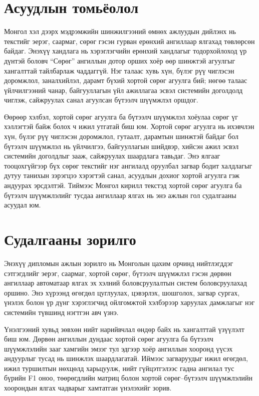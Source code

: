 \section{Асуудлын томьёолол}

Монгол хэл дээрх мэдрэмжийн шинжилгээний өмнөх ажлуудын дийлэнх нь текстийг
эерэг, саармаг, сөрөг гэсэн гурван ерөнхий ангиллаар ялгахад төвлөрсөн байдаг.
Энэхүү хандлага нь хэрэглэгчийн ерөнхий хандлагыг тодорхойлоход үр дүнтэй боловч
``Сөрөг'' ангиллын дотор орших хоёр өөр шинжтэй агуулгыг хангалттай
тайлбарлаж чаддаггүй. Нэг талаас хувь хүн, бүлэг рүү чиглэсэн доромжлол,
заналхийлэл, дарамт бүхий хортой сөрөг агуулга бий; нөгөө талаас үйлчилгээний
чанар, байгууллагын үйл ажиллагаа эсвэл системийн доголдолд чиглэж, сайжруулах
санал агуулсан бүтээлч шүүмжлэл оршдог.

Өөрөөр хэлбэл, хортой сөрөг агуулга ба бүтээлч шүүмжлэл хоёулаа сөрөг үг
хэллэгтэй байж болох ч ижил утгатай биш юм. Хортой сөрөг агуулга нь ихэвчлэн
хүн, бүлэг рүү чиглэсэн доромжлол, гутаалт, дарамтын шинжтэй байдаг бол
бүтээлч шүүмжлэл нь үйлчилгээ, байгууллагын шийдвэр, хийсэн ажил эсвэл
системийн доголдлыг зааж, сайжруулах шаардлага тавьдаг. Энэ ялгааг тооцохгүйгээр
бүх сөрөг текстийг нэг ангилалд оруулбал загвар бодит халдлагыг дутуу танихын
зэрэгцээ хэрэгтэй санал, асуудлын дохиог хортой агуулга гэж андуурах эрсдэлтэй.
Тиймээс Монгол кирилл текстэд хортой сөрөг агуулга ба бүтээлч шүүмжлэлийг
тусдаа ангиллаар ялгах нь энэ ажлын гол судалгааны асуудал юм.

\section{Судалгааны зорилго}

Энэхүү дипломын ажлын зорилго нь Монголын цахим орчинд нийтлэгддэг
сэтгэгдлийг эерэг, саармаг, хортой сөрөг, бүтээлч шүүмжлэл гэсэн дөрвөн
ангиллаар автоматаар ялгах эх хэлний боловсруулалтын систем боловсруулахад
оршино. Энэ хүрээнд өгөгдөл цуглуулах, цэвэрлэх, шошголох, загвар сургах,
үнэлэх болон үр дүнг хэрэглэгчид ойлгомжтой хэлбэрээр харуулах дамжлагыг нэг
системийн түвшинд нэгтгэн авч үзнэ.

Үнэлгээний хувьд зөвхөн нийт нарийвчлал өндөр байх нь хангалттай үзүүлэлт биш
юм. Дөрвөн ангиллын дундаас хортой сөрөг агуулга ба бүтээлч шүүмжлэлийн зааг
хамгийн эмзэг тул эдгээр хоёр ангиллын хооронд үүсэх андуурлыг тусад нь
шинжлэх шаардлагатай. Иймээс загваруудыг ижил өгөгдөл, ижил туршилтын нөхцөлд
харьцуулж, нийт гүйцэтгэлээс гадна ангилал тус бүрийн F1 оноо, төөрөгдлийн матриц
болон хортой сөрөг--бүтээлч шүүмжлэлийн хоорондын ялгах чадварыг хамтатган
үнэлэхийг зорив.

